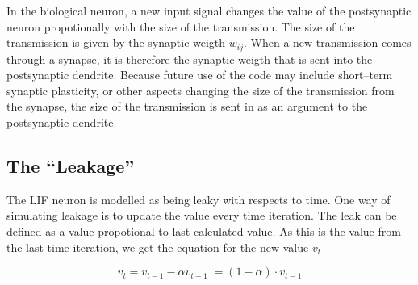 	In the biological neuron, a new input signal changes the value of the postsynaptic neuron propotionally with the size of the transmission.
	The size of the transmission is given by the synaptic weigth $w_{ij}$.
	When a new transmission comes through a synapse, it is therefore the synaptic weigth that is sent into the postsynaptic dendrite.
	Because future use of the code may include short--term synaptic plasticity, or other aspects changing the size of the transmission from the synapse, the size of the transmission is sent in as an argument to the postsynaptic dendrite.



%

	\subsection{The ``Leakage''}
	\label{secTheLeakageForSANN}

	The LIF neuron is modelled as being leaky with respects to time. %
	One way of simulating leakage is to update the value every time iteration. %
	The leak can be defined as a value propotional to last calculated value.
	As this is the value from the last time iteration, we get the equation for the new value $v_t$
	
	\begin{equation}
		v_t = v_{t-1} - \alpha v_{t-1} \; = (1-\alpha) \cdot v_{t-1}
		\label{eqOppdateringAvVerdiEtterLekkasjeSimpelVariant}
	\end{equation}

